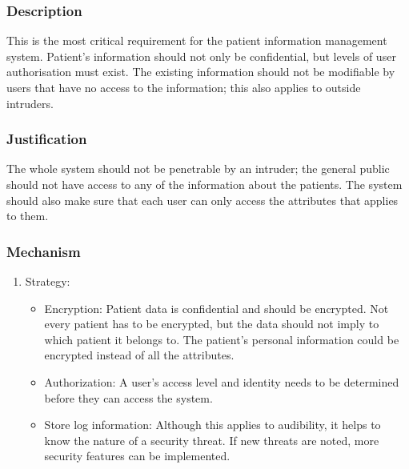 
\subsubsection{Description}
This is the most critical requirement for the patient information management system. Patient's information should not only be 
confidential, but levels of user authorisation must exist. The existing information should not be modifiable by users that have no 
access to the information; this also applies to outside intruders.
\subsubsection{Justification}
The whole system should not be penetrable by an intruder; the general public should not have access to any of the information about the patients. The system should also make sure that each user can only access the attributes that applies to them.
\subsubsection{Mechanism}
	\begin{enumerate}
		\item Strategy:
		
		 	\begin{itemize}
		 	\item Encryption: Patient data is confidential and should be encrypted. Not every patient has to be encrypted, but 
		 	the data should not imply to which patient it belongs to. The patient's personal information could be encrypted instead 			of all the attributes.
		 	\item Authorization: A user's access level and identity needs to be determined before they can access the system. 
		 	\item Store log information: Although this applies to audibility, it helps to know the nature of a security threat.   					If new threats are noted, more security features can be implemented.
		 	\end{itemize}

	\end{enumerate}